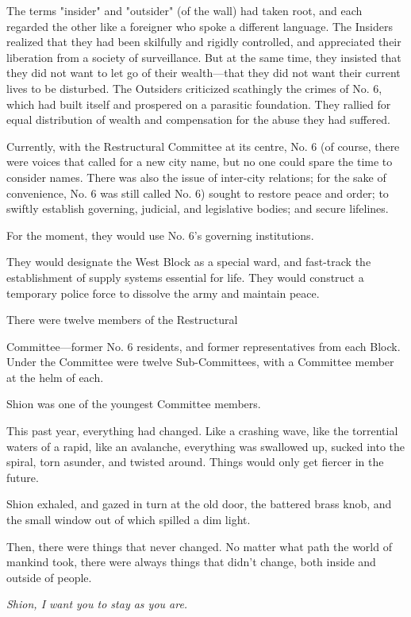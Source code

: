The terms "insider" and "outsider" (of the wall) had taken root, and
each regarded the other like a foreigner who spoke a different language.
The Insiders realized that they had been skilfully and rigidly
controlled, and appreciated their liberation from a society of
surveillance. But at the same time, they insisted that they did not want
to let go of their wealth---that they did not want their current lives to
be disturbed. The Outsiders criticized scathingly the crimes of No. 6,
which had built itself and prospered on a parasitic foundation. They
rallied for equal distribution of wealth and compensation for the abuse
they had suffered.

Currently, with the Restructural Committee at its centre, No. 6 (of
course, there were voices that called for a new city name, but no one
could spare the time to consider names. There was also the issue of
inter-city relations; for the sake of convenience, No. 6 was still
called No. 6) sought to restore peace and order; to swiftly establish
governing, judicial, and legislative bodies; and secure lifelines.

For the moment, they would use No. 6's governing institutions.~

They would designate the West Block as a special ward, and fast-track
the establishment of supply systems essential for life. They would
construct a temporary police force to dissolve the army and maintain
peace.

There were twelve members of the Restructural~

Committee---former No. 6 residents, and former representatives from each
Block. Under the Committee were twelve Sub-Committees, with a Committee
member at the helm of each.~

Shion was one of the youngest Committee members.

This past year, everything had changed. Like a crashing wave, like the
torrential waters of a rapid, like an avalanche, everything was
swallowed up, sucked into the spiral, torn asunder, and twisted around.
Things would only get fiercer in the future.

Shion exhaled, and gazed in turn at the old door, the battered brass
knob, and the small window out of which spilled a dim light.

Then, there were things that never changed. No matter what path the
world of mankind took, there were always things that didn't change, both
inside and outside of people.

\emph{Shion, I want you to stay as you are.}

